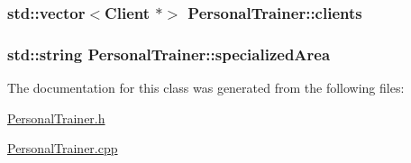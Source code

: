 \subsubsection[{\texorpdfstring{clients}{clients}}]{\setlength{\rightskip}{0pt plus 5cm}std\+::vector$<${\bf Client} $\ast$$>$ Personal\+Trainer\+::clients\hspace{0.3cm}{\ttfamily [private]}}\hypertarget{classPersonalTrainer_a6317476679a0c3365fb02632f1af2aae}{}\label{classPersonalTrainer_a6317476679a0c3365fb02632f1af2aae}
\subsubsection[{\texorpdfstring{specialized\+Area}{specializedArea}}]{\setlength{\rightskip}{0pt plus 5cm}std\+::string Personal\+Trainer\+::specialized\+Area\hspace{0.3cm}{\ttfamily [private]}}\hypertarget{classPersonalTrainer_aed2a4e21367c2cdd67aecba26924e17c}{}\label{classPersonalTrainer_aed2a4e21367c2cdd67aecba26924e17c}


The documentation for this class was generated from the following files\+:\begin{DoxyCompactItemize}
\item 
\hyperlink{PersonalTrainer_8h}{Personal\+Trainer.\+h}\item 
\hyperlink{PersonalTrainer_8cpp}{Personal\+Trainer.\+cpp}\end{DoxyCompactItemize}
